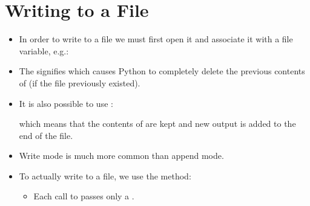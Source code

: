\documentclass[letterpaper,10pt,english]{sphinxmanual}
\begin{document}
\section{Writing to a File}
\label{\detokenize{lecture_notes/lec13_files_web:writing-to-a-file}}\begin{itemize}
\item {} 
In order to write to a file we must first open it and associate it
with a file variable, e.g.:

\begin{sphinxVerbatim}[commandchars=\\\{\}]
   
\end{sphinxVerbatim}

\item {} 
The  signifies  which causes Python to completely
delete the previous contents of  (if the file
previously existed).

\item {} 
It is also possible to use :

\begin{sphinxVerbatim}[commandchars=\\\{\}]
   
\end{sphinxVerbatim}

which means that the contents of  are kept and new
output is added to the end of the file.

\item {} 
Write mode is much more common than append mode.

\item {} 
To actually write to a file, we use the  method:

\begin{sphinxVerbatim}[commandchars=\\\{\}]
\end{sphinxVerbatim}
\begin{itemize}
\item {} 
Each call to  passes only a .


\end{itemize}
\end{itemize}
\end{document}
